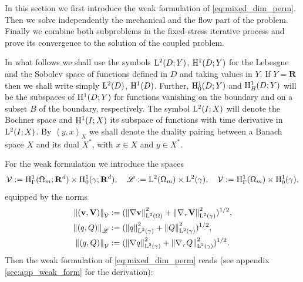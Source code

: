 \documentclass[a4paper]{m2an}
\numberwithin{equation}{section}
\def\dual#1#2{\left\langle #1,#2\right\rangle}
\def\Hf{\mathscr{L}} %
\def\norm#1{\left\|#1\right\|}
\def\Real{{\mathbf R}} %
\def\V{\vc V}
\def\Vel{{\vc{\mathcal V}}} %
\def\Vf{{\mathcal V}} %
\def\vc#1{\mathbf{#1}}     %
\def\vv{\vc v}
\newcommand{\eqs}[1]{\begin{equation*}#1\end{equation*}}
\begin{document}
In this section we first introduce the weak formulation of \eqref{eq:mixed_dim_perm}.
Then we solve independently the mechanical and the flow part of the problem.
Finally we combine both subproblems in the fixed-stress iterative process and prove its convergence to the solution of the coupled problem.

In what follows we shall use the symbols ${\rm L}^{2}(D;Y)$, ${\rm H}^{1}(D;Y)$ for the Lebesgue and the Sobolev space of functions defined in $D$ and taking values in $Y$.
If $Y=\Real$ then we shall write simply ${\rm L}^{2}(D)$, ${\rm H}^{1}(D)$.
Further, ${\rm H}^{1}_0(D;Y)$ and ${\rm H}^{1}_B(D;Y)$ will be the subspaces of ${\rm H}^{1}(D;Y)$ for functions vanishing on the boundary and on a subset $B$ of the boundary, respectively.
The symbol ${\rm L}^{2}(I;X)$ will denote the Bochner space and ${\rm H}^{1}(I;X)$ its subspace of functions with time derivative in ${\rm L}^{2}(I;X)$.
By $\dual{y}{x}_X$ we shall denote the duality pairing between a Banach space $X$ and its dual $X^*$, with $x\in X$ and $y\in X^*$.

For the weak formulation we introduce the spaces
\eqs{ \Vel :=\xHone_\Gamma(\Omega_m;\Real^d)\times \xHone_0(\gamma;\Real^d), \quad
 \Hf := \xLtwo(\Omega_m)\times \xLtwo(\gamma),\quad \Vf := \xHone_\Gamma(\Omega_m)\times \xHone_0(\gamma), }
equipped by the norms
\begin{align*}
\norm{(\vv,\V)}_\Vel &:= (\norm{\nabla\vv}_{\xLtwo(\Omega)}^2 + \norm{\nabla_\tau\vc V}_{\xLtwo(\gamma)}^2)^{1/2},\\
\norm{(q,Q)}_\Hf &:= (\norm{q}_{\xLtwo(\gamma)}^2 + \norm{Q}_{\xLtwo(\gamma)}^2)^{1/2},\\
\norm{(q,Q)}_\Vf &:= (\norm{\nabla q}_{\xLtwo(\gamma)}^2 + \norm{\nabla_\tau Q}_{\xLtwo(\gamma)}^2)^{1/2}.
\end{align*}
Then the weak formulation of \eqref{eq:mixed_dim_perm} reads (see appendix \ref{sec:app_weak_form} for the derivation):
\end{document}
